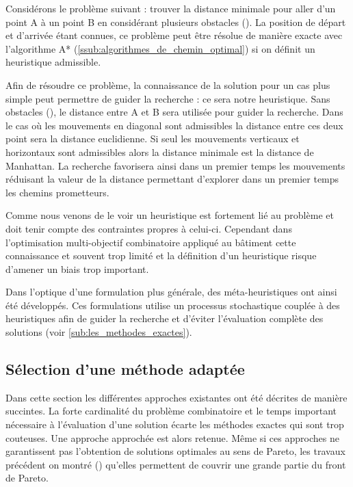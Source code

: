Considérons le problème suivant : trouver la distance minimale pour aller d’un point
A à un point B en considérant plusieurs obstacles ().
La position de départ et d’arrivée étant connues, ce problème peut être résolue
de manière exacte avec l’algorithme A* (\ref{ssub:algorithmes_de_chemin_optimal})
si on définit un heuristique admissible.

Afin de résoudre ce problème, la connaissance de la solution pour un cas plus simple
peut permettre de guider la recherche : ce sera notre heuristique.
Sans obstacles (), le distance entre A et B sera utilisée pour
guider la recherche. Dans le cas où les mouvements en diagonal sont admissibles
la distance entre ces deux point sera la distance euclidienne. Si seul les mouvements
verticaux et horizontaux sont admissibles alors la distance minimale est la distance
de Manhattan.
La recherche favorisera ainsi dans un premier temps les mouvements réduisant la
valeur de la distance permettant d’explorer dans un premier temps les chemins
prometteurs.


Comme nous venons de le voir un heuristique est fortement lié au problème et doit tenir
compte des contraintes propres à celui-ci. Cependant dans l’optimisation multi-objectif combinatoire
appliqué au bâtiment cette connaissance et souvent trop limité et la définition d’un
heuristique risque d’amener un biais trop important.

Dans l’optique d’une formulation plus générale, des méta-heuristiques ont ainsi été développés.
Ces formulations utilise un processus stochastique couplée à des heuristiques afin de guider
la recherche et d’éviter l’évaluation complète des solutions (voir \ref{sub:les_methodes_exactes}).



\subsection{Sélection d’une méthode adaptée} %
\label{sub:selection_d_une_methode_adaptee}
Dans cette section les différentes approches existantes ont été décrites de manière
succintes. La forte cardinalité du problème combinatoire et le temps important nécessaire
à l’évaluation d’une solution écarte les méthodes exactes qui sont trop couteuses. Une
approche approchée est alors retenue. Même si ces approches ne garantissent pas
l’obtention de solutions optimales au sens de Pareto, les travaux précédent on montré
() qu’elles permettent de couvrir une grande partie du front
de Pareto.




